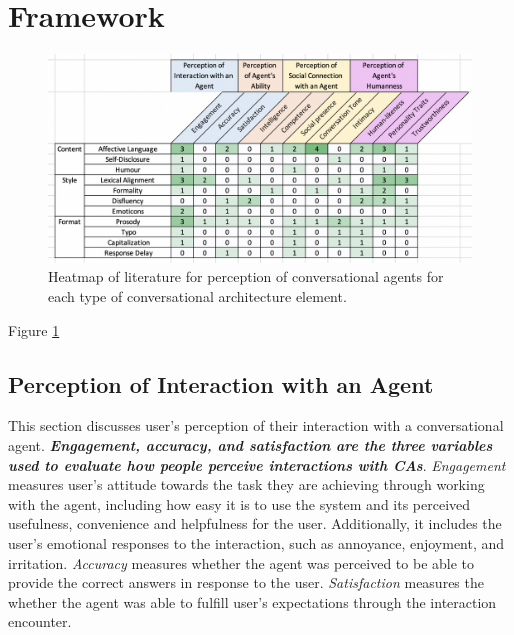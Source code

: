 \documentclass[sigconf,screen,review, anonymous]{acmart}
\begin{document}
\section{Framework}

\begin{figure}[h]
  \centering
  \includegraphics[width=\textwidth]{heatmap.png}
  \caption{Heatmap of literature for perception of conversational agents for each type of conversational architecture element.}
  \label{fig:heatmap}
\end{figure}

Figure \ref{fig:heatmap}



\subsection{Perception of Interaction with an Agent}

This section discusses user's perception of their interaction with a conversational agent. \textbf{\textit{Engagement, accuracy, and satisfaction are the three variables used to evaluate how people perceive interactions with CAs}}. \textit{Engagement} measures user's attitude towards the task they are achieving through working with the agent, including how easy it is to use the system and its perceived usefulness, convenience and helpfulness for the user. Additionally, it includes the user's emotional responses to the interaction, such as annoyance, enjoyment, and irritation. \textit{Accuracy} measures whether the agent was perceived to be able to provide the correct answers in response to the user. \textit{Satisfaction} measures the whether the agent was able to fulfill user's expectations through the interaction encounter.
\end{document}
